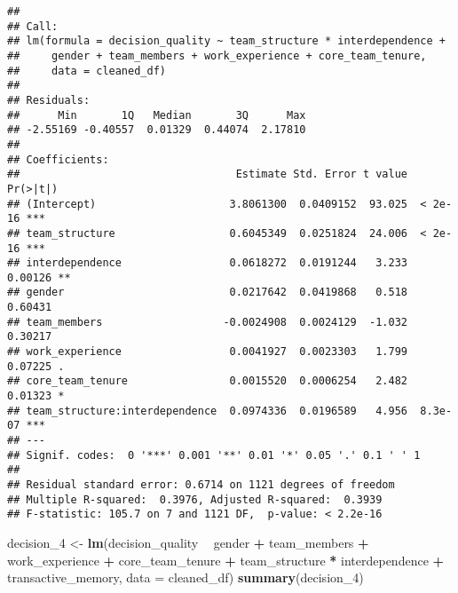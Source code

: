\documentclass[]{article}
\newenvironment{Shaded}{\begin{snugshade}}{\end{snugshade}}
\newcommand{\DataTypeTok}[1]{\textcolor[rgb]{0.13,0.29,0.53}{#1}}
\newcommand{\DecValTok}[1]{\textcolor[rgb]{0.00,0.00,0.81}{#1}}
\newcommand{\KeywordTok}[1]{\textcolor[rgb]{0.13,0.29,0.53}{\textbf{#1}}}
\newcommand{\NormalTok}[1]{#1}
\newcommand{\OperatorTok}[1]{\textcolor[rgb]{0.81,0.36,0.00}{\textbf{#1}}}
\newcommand{\StringTok}[1]{\textcolor[rgb]{0.31,0.60,0.02}{#1}}
\begin{document}
\begin{verbatim}
## 
## Call:
## lm(formula = decision_quality ~ team_structure * interdependence + 
##     gender + team_members + work_experience + core_team_tenure, 
##     data = cleaned_df)
## 
## Residuals:
##      Min       1Q   Median       3Q      Max 
## -2.55169 -0.40557  0.01329  0.44074  2.17810 
## 
## Coefficients:
##                                  Estimate Std. Error t value Pr(>|t|)    
## (Intercept)                     3.8061300  0.0409152  93.025  < 2e-16 ***
## team_structure                  0.6045349  0.0251824  24.006  < 2e-16 ***
## interdependence                 0.0618272  0.0191244   3.233  0.00126 ** 
## gender                          0.0217642  0.0419868   0.518  0.60431    
## team_members                   -0.0024908  0.0024129  -1.032  0.30217    
## work_experience                 0.0041927  0.0023303   1.799  0.07225 .  
## core_team_tenure                0.0015520  0.0006254   2.482  0.01323 *  
## team_structure:interdependence  0.0974336  0.0196589   4.956  8.3e-07 ***
## ---
## Signif. codes:  0 '***' 0.001 '**' 0.01 '*' 0.05 '.' 0.1 ' ' 1
## 
## Residual standard error: 0.6714 on 1121 degrees of freedom
## Multiple R-squared:  0.3976, Adjusted R-squared:  0.3939 
## F-statistic: 105.7 on 7 and 1121 DF,  p-value: < 2.2e-16
\end{verbatim}

\begin{Shaded}
\begin{Highlighting}[]
\NormalTok{decision_}\DecValTok{4}\NormalTok{ <-}\StringTok{ }\KeywordTok{lm}\NormalTok{(decision_quality }\OperatorTok{~}\StringTok{ }\NormalTok{gender }\OperatorTok{+}\StringTok{ }\NormalTok{team_members }\OperatorTok{+}\StringTok{ }\NormalTok{work_experience }\OperatorTok{+}\StringTok{ }\NormalTok{core_team_tenure }\OperatorTok{+}\StringTok{ }\NormalTok{team_structure }\OperatorTok{*}\StringTok{ }\NormalTok{interdependence }\OperatorTok{+}\StringTok{ }\NormalTok{transactive_memory, }\DataTypeTok{data =}\NormalTok{ cleaned_df)}
\KeywordTok{summary}\NormalTok{(decision_}\DecValTok{4}\NormalTok{)}
\end{Highlighting}
\end{Shaded}
\end{document}
